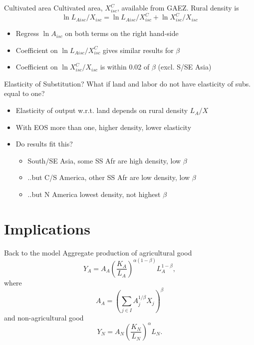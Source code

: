\documentclass[10pt, xcolor=dvipsnames]{beamer}
\begin{document}
\begin{frame}{Cultivated area}\label{cult}
Cultivated area, $X^C_{isc}$, available from GAEZ. Rural density is
\begin{equation}
  \ln L_{Aisc}/X_{isc} = \ln L_{Aisc}/X^C_{isc} + \ln X^C_{isc}/X_{isc}
\end{equation}

\begin{itemize}
  \item Regress $\ln A_{isc}$ on both terms on the right hand-side 
  \item Coefficient on $\ln L_{Aisc}/X^C_{isc}$ gives similar results for $\beta$
  \item Coefficient on $\ln X^C_{isc}/X_{isc}$ is within 0.02 of $\beta$ (excl. S/SE Asia)
\end{itemize}

\hfill \hyperlink{cultreg}{}
\end{frame}


\begin{frame}{Elasticity of Substitution?}\label{eos}
What if land and labor do not have elasticity of subs. equal to one?
\begin{itemize}
  \item Elasticity of output w.r.t. land depends on rural density $L_A/X$
  \item With EOS more than one, higher density, lower elasticity
  \item Do results fit this?
  \begin{itemize}
    \item South/SE Asia, some SS Afr are high density, low $\beta$
    \item ..but C/S America, other SS Afr are low density, low $\beta$
    \item ..but N America lowest density, not highest $\beta$
  \end{itemize}
\end{itemize}
\hfill \hyperlink{rurdbeta}{}
\end{frame}


\section{Implications}

\begin{frame}{Back to the model}\label{extend}
Aggregate production of agricultural good
\begin{equation}
    Y_A = A_A \left(\frac{K_A}{L_A}\right)^{\alpha(1-\beta)} L_A^{1-\beta}, \label{EQ_caL_solve}
\end{equation}
where 
\begin{equation}
    A_A = \left(\sum_{j\in I} A_{j}^{1/\beta}X_{j} \right)^\beta \nonumber
\end{equation}
and non-agricultural good
\begin{equation}
    Y_N = A_N \left(\frac{K_N}{L_N}\right)^{\alpha} L_N. \label{EQ_YN}
\end{equation}
\end{frame}
\end{document}
